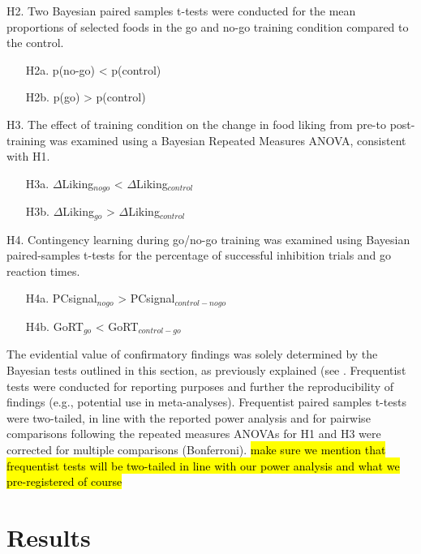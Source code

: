 \documentclass[man,floatsintext]{apa6}
\begin{document}
\noindent H2. Two Bayesian paired samples t-tests were conducted for the
mean proportions of selected foods in the go and no-go training
condition compared to the control.

\begin{itemize}
\item[H2a.] p(no-go) < p(control)
\item[H2b.] p(go) > p(control)
\end{itemize}

\noindent H3. The effect of training condition on the change in food
liking from pre-to post-training was examined using a Bayesian Repeated
Measures ANOVA, consistent with H1.

\begin{itemize}
\item[H3a.] $\Delta$Liking$_{nogo}$ < $\Delta$Liking$_{control}$
\item[H3b.] $\Delta$Liking$_{go}$ > $\Delta$Liking$_{control}$
\end{itemize}

\noindent H4. Contingency learning during go/no-go training was examined
using Bayesian paired-samples t-tests for the percentage of successful
inhibition trials and go reaction times.

\begin{itemize}
\item[H4a.] PCsignal$_{nogo}$ > PCsignal$_{control-nogo}$
\item[H4b.] GoRT$_{go}$ < GoRT$_{control-go}$
\end{itemize}

The evidential value of confirmatory findings was solely determined by
the Bayesian tests outlined in this section, as previously explained
(see \textit{}. Frequentist tests were conducted
for reporting purposes and further the reproducibility of findings
(e.g., potential use in meta-analyses). Frequentist paired samples
t-tests were two-tailed, in line with the reported power analysis and
for pairwise comparisons following the repeated measures ANOVAs for H1
and H3 were corrected for multiple comparisons (Bonferroni).
\hl{make sure we mention that frequentist tests will be two-tailed in line with our power analysis and what we pre-registered of course}

\section{Results}\label{results}
\end{document}
